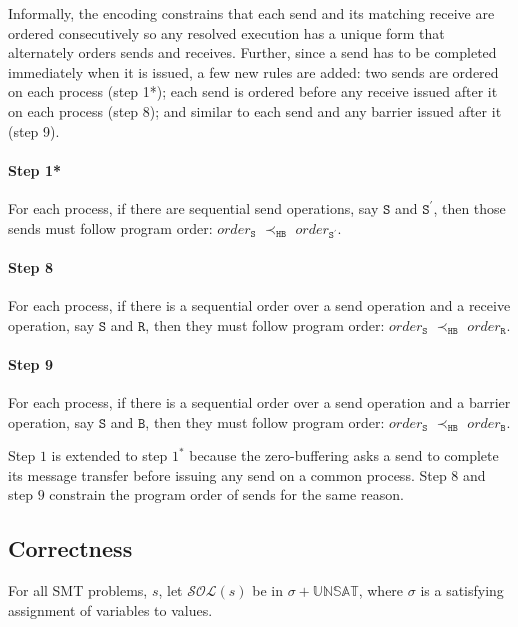 Informally, the encoding constrains that each send and its matching receive are ordered consecutively so any resolved execution has a unique form that alternately orders sends and receives. Further, since a send has to be completed immediately when it is issued, a few new rules are added: two sends are ordered on each process (step 1*); each send is ordered before any receive issued after it on each process (step 8); and similar to each send and any barrier issued after it (step 9).

\paragraph*{Step 1*} For each process, if there are sequential send
operations, say $\mathtt{S}$ and $\mathtt{S^\prime}$, then those
sends must follow program order: $\mathit{order}_\mathtt{S}$
$\prec_\mathtt{HB}$ $\mathit{order}_\mathtt{S^\prime}$.

\paragraph*{Step 8} For each process, if there is a sequential order over a send operation and a receive operation, say $\mathtt{S}$ and $\mathtt{R}$, then they must follow program order: 
$\mathit{order}_\mathtt{S}$
$\prec_\mathtt{HB}$ $\mathit{order}_\mathtt{R}$.

\paragraph*{Step 9} For each process, if there is a sequential order over a send operation and a barrier operation, say $\mathtt{S}$ and $\mathtt{B}$, then they must follow program order: 
$\mathit{order}_\mathtt{S}$
$\prec_\mathtt{HB}$ $\mathit{order}_\mathtt{B}$.

Step $1$ is extended to step $1^*$ because the zero-buffering asks a send to complete its message transfer before issuing any send on a common process. Step $8$ and step $9$ constrain the program order of sends for the same reason.

\subsection{Correctness}

\begin{definition}
For all SMT problems, $s$, let $\mathcal{SOL}(s)$ be in $\sigma +
\mathbb{UNSAT}$, where $\sigma$ is a satisfying assignment of
variables to values.
\end{definition}

